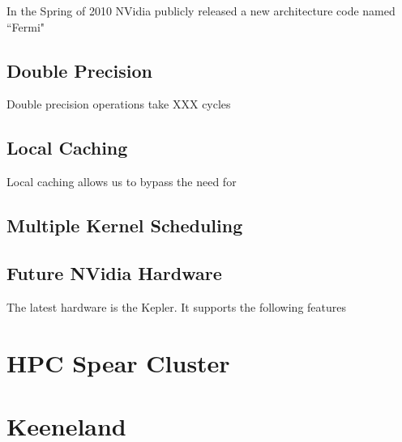 In the Spring of 2010 NVidia publicly released a new architecture code named ``Fermi"

\subsection{Double Precision}
Double precision operations take XXX cycles


\subsection{Local Caching}
Local caching allows us to bypass the need for 

\subsection{Multiple Kernel Scheduling}


\subsection{Future NVidia Hardware}
The latest hardware is the Kepler. It supports the following features

\section{HPC Spear Cluster} 

\section{Keeneland}


%




